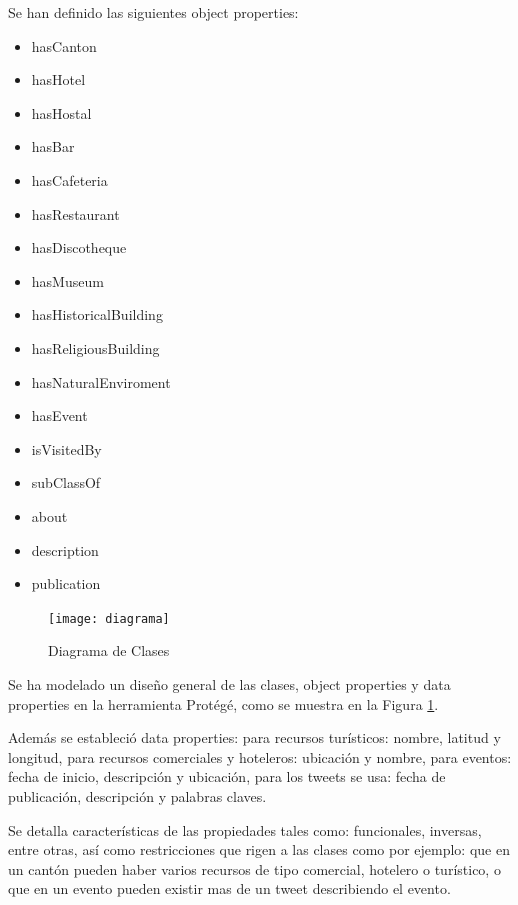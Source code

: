 \documentclass[lnbip,sechang,a4paper]{svmultln}
\begin{document}
\begin{itemize}
Se han definido las siguientes object properties:
\begin{multicols}{2}
\begin{itemize}
    \item hasCanton
    \item hasHotel
    \item hasHostal
    \item hasBar
    \item hasCafeteria
    \item hasRestaurant
    \item hasDiscotheque
    \item hasMuseum
    \item hasHistoricalBuilding
    \item hasReligiousBuilding
    \item hasNaturalEnviroment
    \item hasEvent
    \item isVisitedBy
    \item subClassOf
    \item about
    \item description
    \item publication
\end{itemize}
\end{multicols}



\begin{figure}
\centering
\texttt{[image: diagrama]}
\caption{Diagrama de Clases}
\label{fig:tres}
\end{figure}

Se ha modelado un diseño general de las clases,  object properties y data properties en la herramienta Protégé, como se muestra en la Figura \ref{fig:tres}.

Además se estableció data properties: para recursos turísticos: nombre, latitud y longitud, para recursos comerciales y hoteleros: ubicación y nombre, para eventos: fecha de inicio, descripción y ubicación, para los tweets se usa: fecha de publicación, descripción y palabras claves.

Se detalla características de las propiedades tales como: funcionales, inversas, entre otras, así como restricciones que rigen a las clases como por ejemplo: que en un cantón pueden haber varios recursos de tipo comercial, hotelero o turístico, o que en un evento pueden existir mas de un tweet describiendo el evento.


\end{itemize}
\end{document}
